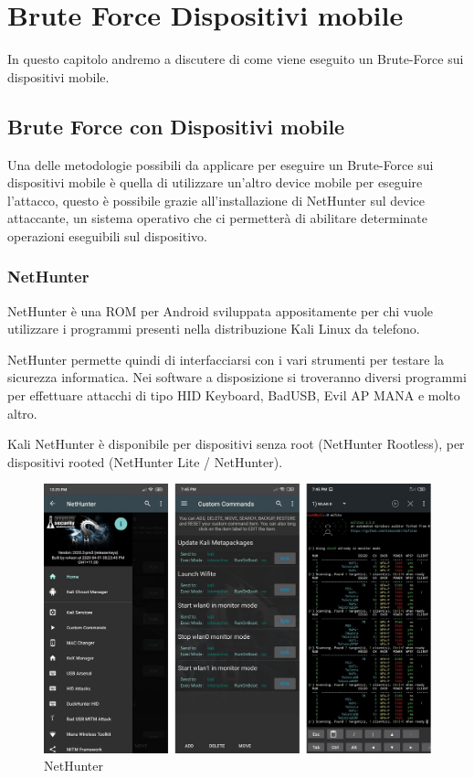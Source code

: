 \chapter{Brute Force Dispositivi mobile}
In questo capitolo andremo a discutere di come viene eseguito un Brute-Force sui dispositivi mobile.

\section{Brute Force con Dispositivi mobile}

Una delle metodologie possibili da applicare per eseguire un Brute-Force sui dispositivi mobile è quella di utilizzare un'altro device mobile per eseguire l'attacco, questo è possibile grazie all'installazione di NetHunter sul device attaccante, un sistema operativo che ci permetterà di abilitare determinate operazioni eseguibili sul dispositivo.

\subsection{NetHunter}

NetHunter\cite{NetHunter} è una ROM per Android sviluppata appositamente per chi vuole utilizzare i programmi presenti nella distribuzione Kali Linux da telefono.

NetHunter permette quindi di interfacciarsi con i vari strumenti per testare la sicurezza informatica. Nei software a disposizione si troveranno diversi programmi per effettuare attacchi di tipo HID Keyboard, BadUSB, Evil AP MANA e molto altro. 

Kali NetHunter è disponibile per dispositivi senza root (NetHunter Rootless), per dispositivi rooted (NetHunter Lite / NetHunter).

\begin{figure}[h!]
    \centering
    \includegraphics[width=116mm]{Immagini/3/nethunter_1.png}
    \caption{NetHunter}
    \label{fig:NetHunter}
\end{figure}

